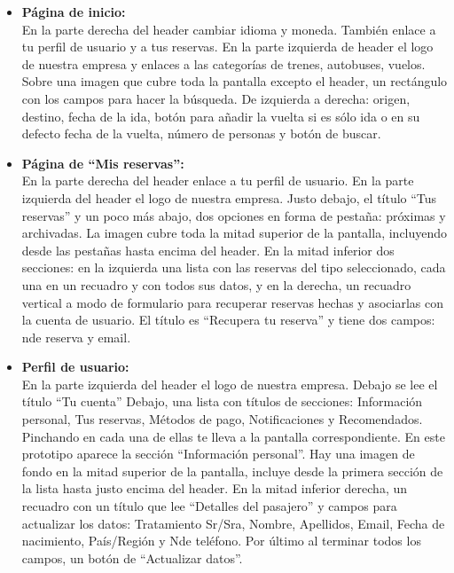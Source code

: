 \begin{itemize}
      \item\textbf{Página de inicio:} \\ En la parte derecha del header cambiar idioma y moneda. También enlace a tu perfil de usuario y a tus reservas.
            En la parte izquierda de header el logo de nuestra empresa y enlaces a las categorías de trenes, autobuses, vuelos.
            Sobre una imagen que cubre toda la pantalla excepto el header, un rectángulo con los campos para hacer la búsqueda. De izquierda a derecha: origen, destino, fecha de la ida, botón para añadir la vuelta si es sólo ida o en su defecto fecha de la vuelta, número de personas y botón de buscar.

    \item\textbf{Página de ``Mis reservas'':} \\ En la parte derecha del header enlace a tu perfil de usuario. En la parte izquierda del header el logo de nuestra empresa.
    Justo debajo, el título “Tus reservas” y un poco más abajo, dos opciones en forma de pestaña: próximas y archivadas.
    La imagen cubre toda la mitad superior de la pantalla, incluyendo desde las pestañas hasta encima del header.
    En la mitad inferior dos secciones: en la izquierda una lista con las reservas del tipo seleccionado, cada una en un recuadro y con todos sus datos, y en la derecha, un recuadro vertical a modo de formulario para recuperar reservas hechas y asociarlas con la cuenta de usuario. El título es “Recupera tu reserva” y tiene dos campos: n\textdegree de reserva y email.
    
    \item\textbf{Perfil de usuario:} \\ En la parte izquierda del header el logo de nuestra empresa. 
    Debajo se lee el título “Tu cuenta”
    Debajo, una lista con títulos de secciones: Información personal, Tus reservas, Métodos de pago, Notificaciones y Recomendados. Pinchando en cada una de ellas te lleva a la pantalla correspondiente. En este prototipo aparece la sección “Información personal”.
    Hay una imagen de fondo en la mitad superior de la pantalla, incluye desde la primera sección de la lista hasta justo encima del header.
    En la mitad inferior derecha, un recuadro con un título que lee “Detalles del pasajero” y campos para actualizar los datos: Tratamiento Sr/Sra, Nombre, Apellidos, Email, Fecha de nacimiento, País/Región y N\textdegree de teléfono. Por último al terminar todos los campos, un botón de “Actualizar datos”.
    
    
\end{itemize}

